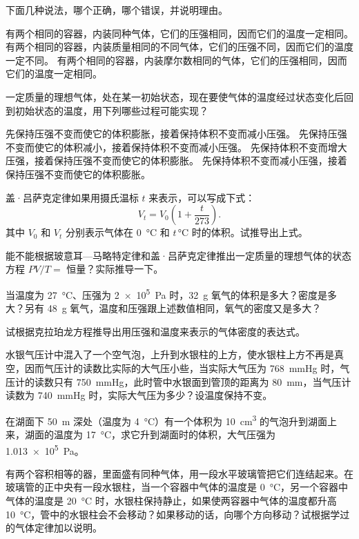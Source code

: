 \begin{Exercise}
\begin{question}
	\item 下面几种说法，哪个正确，哪个错误，并说明理由。
	\begin{tasks}
		\task 有两个相同的容器，内装同种气体，它们的压强相同，因而它们的温度一定相同。
		\task 有两个相同的容器，内装质量相同的不同气体，它们的压强不同，因而它们的温度一定不同。
		\task 有两个相同的容器，内装摩尔数相同的气体，它们的压强相同，因而它们的温度一定相同。
	\end{tasks}
	\item 一定质量的理想气体，处在某一初始状态，现在要使气体的温度经过状态变化后回到初始状态的温度，用下列哪些过程可能实现？
	\begin{tasks}
		\task 先保持压强不变而使它的体积膨胀，接着保持体积不变而减小压强。
		\task 先保持压强不变而使它的体积减小，接着保持体积不变而减小压强。
		\task 先保持体积不变而增大压强，接着保持压强不变而使它的体积膨胀。
		\task 先保持体积不变而减小压强，接着保持压强不变而使它的体积膨胀。	 
	\end{tasks}
	\item 盖·吕萨克定律如果用摄氏温标 $t$ 来表示，可以写成下式：
	\[V_t=V_0\left(1+\frac{t}{273}\right).\]
	其中 $V_0$ 和 $V_t$ 分别表示气体在 \qty{0}{\celsius} 和 $t$\,\unit{\celsius} 时的体积。试推导出上式。
	\item 能不能根据玻意耳—马略特定律和盖·吕萨克定律推出一定质量的理想气体的状态方程 $PV/T=$ 恒量？实际推导一下。
	\item 当温度为 \qty{27}{\celsius}、压强为 \qty{2e5}{Pa} 时，\qty{32}{g} 氧气的体积是多大？密度是多大？另有 \qty{48}{g} 氧气，温度和压强跟上述数值相同，氧气的密度又是多大？	
	\item 试根据克拉珀龙方程推导出用压强和温度来表示的气体密度的表达式。
	\item 水银气压计中混入了一个空气泡，上升到水银柱的上方，使水银柱上方不再是真空，因而气压计的读数比实际的大气压小些，当实际大气压为 \qty{768}{mmHg} 时，气压计的读数只有 \qty{750}{mmHg}，此时管中水银面到管顶的距离为 \qty{80}{mm}，当气压计读数为 \qty{740}{mmHg} 时，实际大气压为多少？设温度保持不变。
	\item 在湖面下 \qty{50}{m} 深处（温度为 \qty{4}{\celsius}）有一个体积为 \qty{10}{cm^3} 的气泡升到湖面上来，湖面的温度为 \qty{17}{\celsius}，求它升到湖面时的体积，大气压强为 \qty{1.013e5}{Pa}。
	\item 有两个容积相等的器，里面盛有同种气体，用一段水平玻璃管把它们连结起来。在玻璃管的正中央有一段水银柱，当一个容器中气体的温度是 \qty{0}{\celsius}，另一个容器中气体的温度是 \qty{20}{\celsius} 时，水银柱保持静止，如果使两容器中气体的温度都升高 \qty{10}{\celsius}，管中的水银柱会不会移动？如果移动的话，向哪个方向移动？试根据学过的气体定律加以说明。

\end{question}
\end{Exercise}
